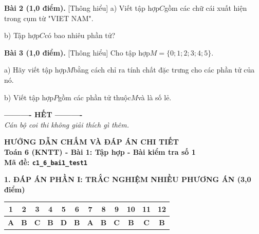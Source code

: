 \documentclass[11pt,a4paper]{article}
\begin{document}
\noindent\textbf{Bài 2 (1,0 điểm).} [Thông hiểu] a) Viết tập hợp$C$gồm các chữ cái xuất hiện trong cụm từ "VIET NAM".\par\noindent b) Tập hợp$C$có bao nhiêu phần tử?\par\vspace{8pt}

\noindent\textbf{Bài 3 (1,0 điểm).} [Thông hiểu] Cho tập hợp$M = \{0; 1; 2; 3; 4; 5\}$.\par\noindent a) Hãy viết tập hợp$M$bằng cách chỉ ra tính chất đặc trưng cho các phần tử của nó.\par\noindent b) Viết tập hợp$P$gồm các phần tử thuộc$M$và là số lẻ.\par\vspace{8pt}


\begin{center}
\textbf{---------- HẾT ----------}\\
\textit{\small Cán bộ coi thi không giải thích gì thêm.}
\end{center}

\newpage
\begin{center}
{\Large\bfseries HƯỚNG DẪN CHẤM VÀ ĐÁP ÁN CHI TIẾT}\\[4pt]
{\large\bfseries Toán 6 (KNTT) - Bài 1: Tập hợp - Bài kiểm tra số 1}\\[2pt]
{\bfseries Mã đề: \texttt{c1\_6\_bai1\_test1}}
\end{center}

\vspace{10pt}
\noindent\textbf{\large 1. ĐÁP ÁN PHẦN I: TRẮC NGHIỆM NHIỀU PHƯƠNG ÁN (3,0 điểm)}
\vspace{4pt}
\begin{center}
\begin{tabular}{|c|c|c|c|c|c|c|c|c|c|c|c|}
\hline
\textbf{1} & \textbf{2} & \textbf{3} & \textbf{4} & \textbf{5} & \textbf{6} & \textbf{7} & \textbf{8} & \textbf{9} & \textbf{10} & \textbf{11} & \textbf{12} \\
\hline
\textbf{A} & \textbf{B} & \textbf{C} & \textbf{B} & \textbf{D} & \textbf{B} & \textbf{A} & \textbf{B} & \textbf{C} & \textbf{B} & \textbf{C} & \textbf{B} \\
\hline
\end{tabular}
\end{center}
\vspace{6pt}
\end{document}
